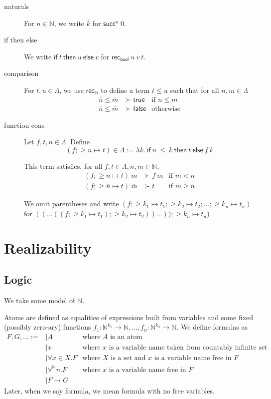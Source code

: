 \documentclass{article}
\newcommand{\successor}{\mathsf{succ}}
\newcommand{\N}{\mathbb{N}}
\newcommand{\recN}{\mathsf{rec}_{\mathbb{N}}}
\newcommand{\true}{\mathsf{true}}
\newcommand{\false}{\mathsf{false}}
\newcommand{\recbool}{\mathsf{rec_{bool}}}
\newcommand{\iif}{\mathsf{if}}
\newcommand{\eelse}{\mathsf{else}}
\newcommand{\tthen}{\mathsf{then}}
\newcommand{\depforall}[1]{\forall^\N #1.}
\begin{document}
\begin{description}
    \item[naturals] For $n \in \N$, we write $\overline{k}$ for $\successor^n\ 0$.
    \item[if then else] We write $\iif\ t\ \tthen\ u\ \eelse\ v$ for $\recbool\ u\ v\ t$.
    \item[comparison] For $t, u \in \Lambda$, we use $\recN$ to define a term $t \le u$ such that for all $n, m \in \Lambda$
    \begin{align*}
        \overline{n} \le \overline{m} & \succ \true & \text{if $n \le m$} \\
        \overline{n} \le \overline{m} & \succ \false & \text{otherwise}
    \end{align*}
    \item[function cons] Let $f, t, n \in \Lambda$. Define
    \[(f; \ge n \mapsto t) \in \Lambda := \lambda k.\ \iif\ n\ \le\ k\ \tthen\ t\ \eelse\ f\ k\]
    
    This term satisfies, for all $f, t \in \Lambda, n, m \in \N$,
    \begin{align*}
        (f; \ge \overline{n} \mapsto t)\ \overline{m} & \succ f\ \overline{m} & \text{if $m < n$} \\
        (f; \ge \overline{n} \mapsto t)\ \overline{m} & \succ t & \text{if $m \ge n$}
    \end{align*}

    We omit parentheses and write $(f; \ge k_1 \mapsto t_1; \ge k_2 \mapsto t_2; \dots; \ge k_n \mapsto t_n)$ for $((\dots((f; \ge k_1 \mapsto t_1); \ge k_2 \mapsto t_2))\dots)); \ge k_n \mapsto t_n)$
\end{description}

\section{Realizability}

\subsection{Logic}

We take some model of $\N$.

Atoms are defined as equalities of expressions built from variables and some fixed (possibly zero-ary) functions $f_1 : \N^{k_1} \rightarrow \N, \dots, f_n : \N^{k_n} \rightarrow \N$.
We define formulas as
\begin{align*}
    F, G, \dots := & \mid A & \text{where $A$ is an atom} \\
    & \mid x & \text{where $x$ is a variable name taken from countably infinite set} \\
    & \mid \forall x \in X. F & \text{where $X$ is a set and $x$ is a variable name free in $F$} \\
    & \mid \depforall{n} F & \text{where $x$ is a variable name free in $F$} \\
    & \mid F \rightarrow G
\end{align*}
Later, when we say formula, we mean formula with no free variables.
\end{document}
